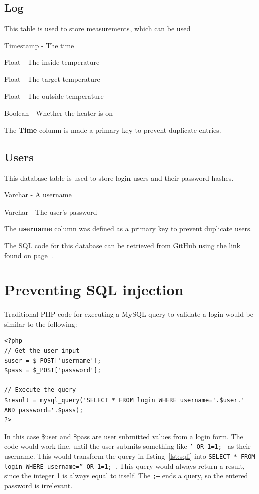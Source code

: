 \documentclass[12pt,a4paper,final]{report}
\begin{document}
\section*{Log}
This table is used to store measurements, which can be used 
\begin{description} \label{logCols}
	\item[Time] Timestamp - The time
	\item[T] Float - The inside temperature
	\item[T\_target] Float - The target temperature
	\item[T\_o] Float - The outside temperature
	\item[Heating] Boolean - Whether the heater is on
\end{description}
The \textbf{Time} column is made a primary key to prevent duplicate entries.

\section*{Users}
This database table is used to store login users and their password hashes.
\begin{description} \label{userCols}
	\item[username] Varchar - A username
	\item[password] Varchar - The user's password
\end{description}
The \textbf{username} column was defined as a primary key to prevent duplicate users.

The SQL code for this database can be retrieved from GitHub using the link found on page~\pageref{chap:Software}.

\chapter{Preventing SQL injection}
Traditional PHP code for executing a MySQL query to validate a login would be similar to the following:
\lstset{language=PHP}
\begin{lstlisting}[caption={Example PHP MySQL login code},label={lst:sqli}]
<?php
// Get the user input
$user = $_POST['username'];
$pass = $_POST['password'];

// Execute the query
$result = mysql_query('SELECT * FROM login WHERE username='.$user.' AND password='.$pass);
?>
\end{lstlisting}
In this case \$user and \$pass are user submitted values from a login form. The code would work fine, until the user submits something like \texttt{' OR 1=1;--} as their username. This would transform the query in listing~\ref{lst:sqli} into \texttt{SELECT * FROM login WHERE username='' OR 1=1;--}. This query would always return a result, since the integer 1 is always equal to itself. The \texttt{;--} ends a query, so the entered password is irrelevant.
\end{document}
